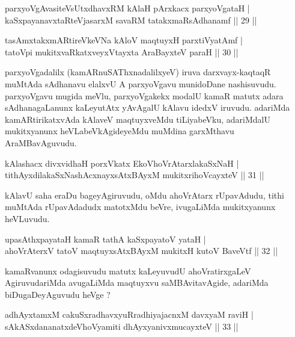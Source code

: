 \begin{shl}
parxyoVgAvasiteVsUtxdhavxRM kAlaH pArxkacx parxyoVgataH |\\
kaSxpayanavxtaRteVjasarxM savaRM tatakxmaRsAdhanamf \hfill || 29 || 
\end{shl}

\begin{shl}
tasAmxtakxmARtireVkeVNa kAloV maqtuyxH parxtiVyatAmf |\\
tatoV\s pi mukitxvaRkatxveyxVtayxta AraBayxteV paraH \hfill || 30 ||
\end{shl}

\begin{artha}
parxyoVgadalilx (kamARnuSAThxnadalilxyeV) iruva darxvayx-kaqtaqR muMtAda sAdhanavu elalxvU A parxyoVgavu munidoDane nashisuvudu. parxyoVgavu mugida meVlu, parxyoVgakekx modalU kamaR matutx adara sAdhanagaLanunx kaLeyutAtx yAvAgalU kAlavu idedxV iruvudu. adariMda kamARtirikatxvAda kAlaveV maqtuyxveMdu tiLiyabeVku, adariMdalU mukitxyanunx heVLabeVkAgideyeMdu muMdina garxMthavu AraMBavAguvudu.
\end{artha}

\begin{shl}
kAlashacx divxvidhaH porxVkatx EkoV\s hoVrAtarxlakaSxNaH |\\
tithAyxdilakaSxNashAcxnayxsAtxBAyxM mukitxrihoVcayxteV \hfill || 31 ||
\end{shl}

\begin{artha}
kAlavU saha eraDu bageyAgiruvudu, oMdu ahoVrAtarx rUpavAdudu, tithi muMtAda rUpavAdadudx matotxMdu beVre, ivugaLiMda mukitxyanunx heVLuvudu.
\end{artha}


\begin{shl}
upasAthxpayataH kamaR tathA kaSxpayatoV yataH |\\
ahoVrAterxV tatoV maqtuyxsAtxBAyxM mukitxH kutoV BaveVtf \hfill || 32 ||
\end{shl}

\begin{artha}
kamaRvanunx odagisuvudu matutx kaLeyuvudU ahoVratirxgaLeV AgiruvudariMda avugaLiMda maqtuyxvu saMBAvitavAgide, adariMda biDugaDeyAguvudu heVge ?
\end{artha}


\begin{shl}
adhAyxtamxM cakuSxradhavxyuRradhiyajacnxM davxyaM raviH |\\
sAkASxdananatxdeVhoV\s yamiti dhAyxyanivxmucayxteV \hfill || 33 ||
\end{shl}

